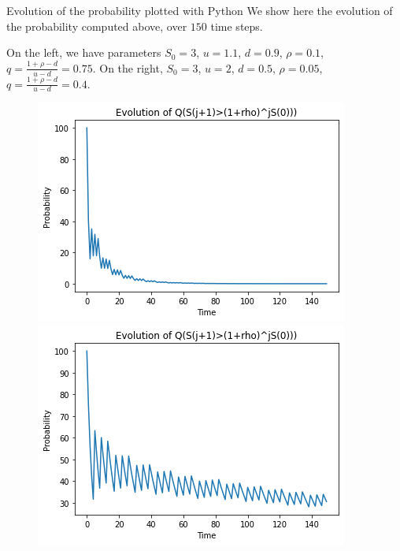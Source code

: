\documentclass[9 pt]{beamer} %
\begin{document}
\begin{frame}{Evolution of the probability plotted with Python}
We show here the evolution of the probability computed above, over $150$ time steps. 

On the left, we have parameters $S_0=3$, $u=1.1$, $d=0.9$, $\rho=0.1$, $q=\frac{1+\rho-d}{u-d}=0.75$. On the right, $S_0=3$, $u=2$, $d=0.5$, $\rho=0.05$, $q=\frac{1+\rho-d}{u-d}=0.4$.
 \begin{figure}
\centering
\begin{minipage}[b]{.5\textwidth}
  \centering
 \includegraphics[scale=0.4]{probu2.png}
\end{minipage}%
\begin{minipage}[b]{.5\textwidth}
  \centering
 \includegraphics[scale=0.4]{probu11.png}
\end{minipage}
\end{figure}
\end{frame}
\end{document}
